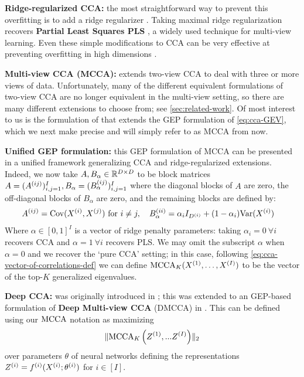 \textbf{Ridge-regularized CCA:} the most straightforward way to prevent this overfitting is to add a ridge regularizer \citep{vinod1976canonical}.
Taking maximal ridge regularization recovers \textbf{Partial Least Squares PLS} \citep{mihalik2022canonical}, a widely used technique for multi-view learning.
Even these simple modifications to CCA can be very effective at preventing overfitting in high dimensions \citep{mihalik2022canonical}.

\textbf{Multi-view CCA (MCCA):} extends two-view CCA to deal with three or more views of data. Unfortunately, many of the different equivalent formulations of two-view CCA are no longer equivalent in the multi-view setting, so there are many different extensions to choose from; see \cref{sec:related-work}. Of most interest to us is the formulation of \cite{nielsen2002multiset, wong2021deep} that extends the GEP formulation of \cref{eq:cca-GEV}, which we next make precise and will simply refer to as MCCA from now.

\textbf{Unified GEP formulation:}
this GEP formulation of MCCA can be presented in a unified framework generalizing CCA and ridge-regularized extensions. Indeed, we now take $A,B_\alpha \in \mathbb{R}^{D \times D}$ to be block matrices $A = (A^{(ij)})_{i,j=1}^I, B_\alpha = (B_\alpha^{(ij)})_{i,j=1}^I$ where the diagonal blocks of $A$ are zero, the off-diagonal blocks of $B_\alpha$ are zero, and the remaining blocks are defined by:
\begin{align}\label{eq:gep-most-general-formulation}%
    A^{(ij)} &= \Cov(X\sps{i}, X\sps{j}) \text{ for } i \neq j, \quad %
    B_\alpha^{(ii)} = \alpha_i I_{D\sps{i}} + (1-\alpha_i) \Var(X\sps{i})  %
\end{align}
Where $\alpha \in [0,1]^I$ is a vector of ridge penalty parameters: taking $\alpha_i = 0 \: \forall i$ recovers CCA and $\alpha = 1 \: \forall i$ recovers PLS.
We may omit the subscript $\alpha$ when $\alpha=0$ and we recover the `pure CCA' setting; in this case, following \cref{eq:cca-vector-of-correlations-def} we can define $\operatorname{MCCA}_K(X^{(1)},\dots,X^{(I)})$ to be the vector of the top-$K$ generalized eigenvalues.


\textbf{Deep CCA:} was originally introduced in \cite{andrew2013deep}; this was extended to an GEP-based formulation of \textbf{Deep Multi-view CCA} (DMCCA) in \cite{somandepalli2019multimodal}. This can be defined using our $\operatorname{MCCA}$ notation as maximizing
\begin{align}\label{eq:DMCCA-def}
    \lVert\operatorname{MCCA}_K\left(Z^{(1)}, ... Z^{(I)}\right)\rVert_2
\end{align}
over parameters $\theta$ of neural networks defining the representations $Z^{(i)}=f^{(i)}(X^{(i)};\theta^{(i)})$ for $i\in[I]$.

